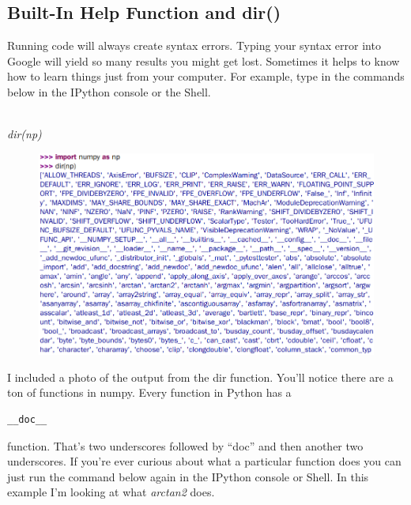 
\subsection{Built-In Help Function and dir()}

Running code will always create syntax errors. Typing your syntax
error into Google will yield so many results you might get
lost. Sometimes it helps to know how to learn things just from your
computer. For example, type in the commands below in the IPython
console or the Shell.

\\
{\it dir(np)}
\ \\

\begin{figure}[H]
  \begin{center}
    \includegraphics[width=\textwidth]{Figures/dir.png}
  \end{center}
\end{figure}

I included a photo of the output from the dir function. You’ll notice
there are a ton of functions in numpy. Every function in Python has a
\begin{verbatim} 
__doc__
\end{verbatim}

function. That’s two underscores followed by “doc” and then
another two underscores. If you’re ever curious about what a
particular function does you can just run the command below again in
the IPython console or Shell. In this example I’m looking at what
{\it arctan2} does.  

